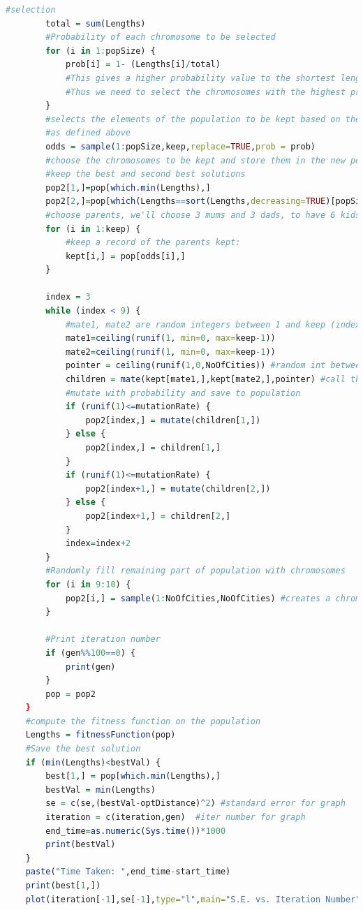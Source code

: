\documentclass[11pt,a4paper,final]{article}
\begin{document}
\begin{lstlisting}[language = R,caption= Genetic Algorithm Code,label=GACode]
		#selection
		total = sum(Lengths)
		#Probability of each chromosome to be selected
		for (i in 1:popSize) {
			prob[i] = 1- (Lengths[i]/total)
			#This gives a higher probability value to the shortest lengths
			#Thus we need to select the chromosomes with the highest probability
		}
		#selects the elements of the population to be kept based on the probability distribution
		#as defined above
		odds = sample(1:popSize,keep,replace=TRUE,prob = prob)
		#choose the chromosomes to be kept and store them in the new population 
		#keep the best and second best solutions
		pop2[1,]=pop[which.min(Lengths),]
		pop2[2,]=pop[which(Lengths==sort(Lengths,decreasing=TRUE)[popSize-1])[1],]
		#choose parents, we'll choose 3 mums and 3 dads, to have 6 kids:
		for (i in 1:keep) {
			#keep a record of the parents kept:
			kept[i,] = pop[odds[i],]
		}
	
		index = 3
		while (index < 9) {
			#mate1, mate2 are random integers between 1 and keep (index)
			mate1=ceiling(runif(1, min=0, max=keep-1))
			mate2=ceiling(runif(1, min=0, max=keep-1))
			pointer = ceiling(runif(1,0,NoOfCities)) #random int between 1 and NoOfCities
			children = mate(kept[mate1,],kept[mate2,],pointer) #call the mate function
			#mutate with probability and save to population
			if (runif(1)<=mutationRate) {
				pop2[index,] = mutate(children[1,])
			} else {
				pop2[index,] = children[1,]
			}
			if (runif(1)<=mutationRate) {
				pop2[index+1,] = mutate(children[2,])
			} else {
				pop2[index+1,] = children[2,]
			}
			index=index+2
		}
		#Randomly fill remaining part of population with chromosomes
		for (i in 9:10) {
			pop2[i,] = sample(1:NoOfCities,NoOfCities) #creates a chromosome
		}
	
		#Print iteration number
		if (gen%%100==0) {
			print(gen)
		}
		pop = pop2
	}
	#compute the fitness function on the population
	Lengths = fitnessFunction(pop)
	#Save the best solution 
	if (min(Lengths)<bestVal) {
		best[1,] = pop[which.min(Lengths),]
		bestVal = min(Lengths)
		se = c(se,(bestVal-optDistance)^2) #standard error for graph
		iteration = c(iteration,gen)  #iter number for graph
		end_time=as.numeric(Sys.time())*1000
		print(bestVal)
	}
	paste("Time Taken: ",end_time-start_time)
	print(best[1,])
	plot(iteration[-1],se[-1],type="l",main="S.E. vs. Iteration Number",xlab="Iteration",ylab="S.E.")
	\end{lstlisting}
	
\end{document}
